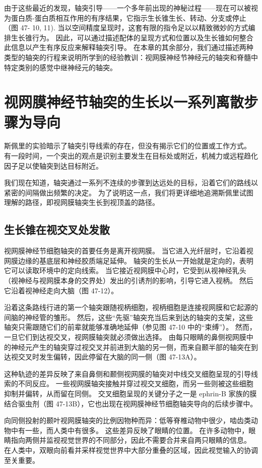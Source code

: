 由于这些最近的发现，轴突引导——一个多年前出现的神秘过程——现在可以被视为蛋白质-蛋白质相互作用的有序结果，它指示生长锥生长、转动、分支或停止（图 47- 10, 11). 当以空间精度呈现时，这套有限的指令足以以精致微妙的方式编排生长锥行为。 因此，可以通过描述配体的呈现方式和位置以及生长锥如何整合此信息以产生有序反应来解释轴突引导。 在本章的其余部分，我们通过描述两种类型的轴突的行程来说明所学到的经验教训：视网膜神经节神经元的轴突和脊髓中特定类别的感觉中继神经元的轴突。


\section{视网膜神经节轴突的生长以一系列离散步骤为导向}
斯佩里的实验暗示了轴突引导线索的存在，但没有揭示它们的位置或工作方式。 有一段时间，一个突出的观点是识别主要发生在目标处或附近，机械力或远程趋化因子足以使轴突到达目标附近。

我们现在知道，轴突通过一系列不连续的步骤到达远处的目标，沿着它们的路线以紧密的间隔做出频繁的决定。 为了说明这一点，我们将更详细地追溯斯佩里试图理解的路径，即视网膜轴突生长到视顶盖的路径。

\subsection{生长锥在视交叉处发散}
视网膜神经节细胞轴突的首要任务是离开视网膜。 当它进入光纤层时，它沿着视网膜边缘的基底层和神经胶质端足延伸。 轴突的生长从一开始就是定向的，表明它可以读取环境中的定向线索。 当它接近视网膜中心时，它受到从视神经乳头（视神经与视网膜本身的交界处）发出的引诱剂的影响，引导它进入视柄。 然后它沿着视神经走向大脑（图 47-12）。

沿着这条路线行进的第一个轴突跟随视柄细胞，视柄细胞是连接视网膜和它起源的间脑的神经管的雏形。 然后，这些“先驱”轴突充当后来到达的轴突的支架，这些轴突只需跟随它们的前辈就能够准确地延伸（参见图 47-10 中的“束缚”）。 然而，一旦它们到达视交叉，视网膜轴突就必须做出选择。 由每只眼睛的鼻侧视网膜中的神经元产生的轴突穿过视交叉并前进到大脑的另一侧，而来自颞半部的轴突在到达视交叉时发生偏转，因此停留在大脑的同一侧（图 47-13A）。

这种轨迹的差异反映了来自鼻侧和颞侧视网膜的轴突对中线交叉细胞呈现的引导线索的不同反应。 一些视网膜轴突接触并穿过视交叉细胞，而另一些则被这些细胞抑制并偏转，从而留在同侧。 交叉细胞呈现的关键分子之一是 ephrin-B 家族的膜结合驱虫剂（图 47-13B），它也出现在视网膜神经节细胞轴突导向的后续步骤中。

向同侧投射的颞叶视网膜轴突的比例因物种而异：低等脊椎动物中很少，啮齿类动物中有一些，而人类中有很多。 这些差异反映了眼睛的位置。 在许多动物中，眼睛指向两侧并监视视觉世界的不同部分，因此不需要合并来自两只眼睛的信息。 在人类中，双眼向前看并采样视觉世界中大部分重叠的区域，因此视觉输入的协调至关重要。

